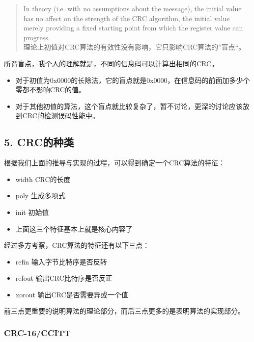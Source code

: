 \documentclass[
]{article}
\begin{document}
\begin{quote}
In theory (i.e. with no assumptions about the message), the initial
value has no affect on the strength of the CRC algorithm, the initial
value merely providing a fixed starting point from which the register
value can progress. \\
理论上初值对CRC算法的有效性没有影响，它只影响CRC算法的''盲点``。
\end{quote}

所谓盲点，我个人的理解就是，不同的信息码可以计算出相同的CRC。

\begin{itemize}
\item
  对于初值为0x0000的长除法，它的盲点就是0x0000，在信息码的前面加多少个零都不影响CRC的值。
\item
  对于其他初值的算法，这个盲点就比较复杂了，暂不讨论，更深的讨论应该放到CRC的检测误码性能中。
\end{itemize}

\newpage
\hypertarget{header-n273}{%
\subsection{5. CRC的种类}\label{header-n273}}

根据我们上面的推导与实现的过程，可以得到确定一个CRC算法的特征：

\begin{itemize}
\item
  width CRC的长度
\item
  poly 生成多项式
\item
  init 初始值
\item
  上面这三个特征基本上就是核心内容了
\end{itemize}

经过多方考察，CRC算法的特征还有以下三点：

\begin{itemize}
\item
  refin 输入字节比特序是否反转
\item
  refout 输出CRC比特序是否反正
\item
  xorout 输出CRC是否需要异或一个值
\end{itemize}

前三点更重要的说明算法的理论部分，而后三点更多的是表明算法的实现部分。

\hypertarget{header-n293}{%
\subsubsection{CRC-16/CCITT}\label{header-n293}}
\end{document}
